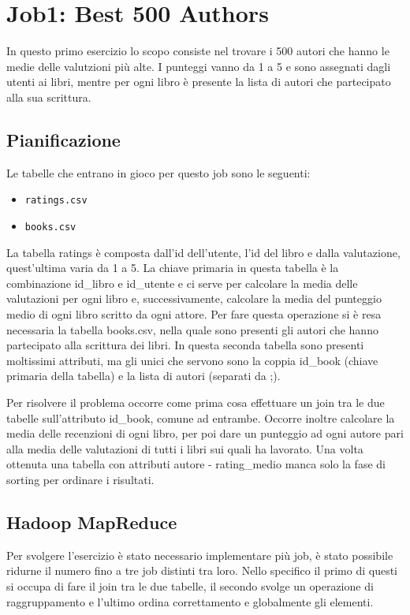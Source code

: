 \section{Job1: Best 500 Authors}

In questo primo esercizio lo scopo consiste nel trovare i 500 autori che hanno le medie delle valutzioni più alte.
I punteggi vanno da 1 a 5 e sono assegnati dagli utenti ai libri, mentre per ogni libro è presente la lista di autori che
partecipato alla sua scrittura.

\subsection{Pianificazione}
Le tabelle che entrano in gioco per questo job sono le seguenti:
\begin{itemize}
    \item \texttt{ratings.csv}
    \item \texttt{books.csv}
\end{itemize}

La tabella ratings è composta dall'id dell'utente, l'id del libro e dalla valutazione, quest'ultima varia da 1 a 5.
La chiave primaria in questa tabella è la combinazione id_libro e id_utente e ci serve per calcolare la media delle
valutazioni per ogni libro e, successivamente, calcolare la media del punteggio medio di ogni libro scritto da ogni attore.
Per fare questa operazione si è resa necessaria la tabella books.csv, nella quale sono presenti gli autori che hanno
partecipato alla scrittura dei libri.
In questa seconda tabella sono presenti moltissimi attributi, ma gli unici che servono sono la coppia id_book
(chiave primaria della tabella) e la lista di autori (separati da ;).

Per risolvere il problema occorre come prima cosa effettuare un join tra le due tabelle sull'attributo id_book, comune ad entrambe.
Occorre inoltre calcolare la media delle recenzioni di ogni libro, per poi dare un punteggio ad ogni autore pari alla media delle
valutazioni di tutti i libri sui quali ha lavorato.
Una volta ottenuta una tabella con attributi autore - rating_medio manca solo la fase di sorting per ordinare i risultati.

\subsection{Hadoop MapReduce}
Per svolgere l'esercizio è stato necessario implementare più job, è stato possibile ridurne il numero fino a tre job distinti tra loro.
Nello specifico il primo di questi si occupa di fare il join tra le due tabelle, il secondo svolge un operazione di raggruppamento e l'ultimo
ordina correttamento e globalmente gli elementi.


